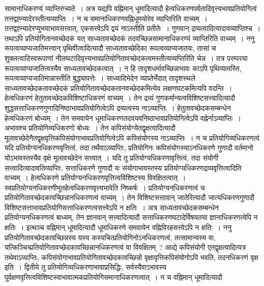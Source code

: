 सामानाधिकरण्यं व्याप्तिरुच्यते~।
अत्र यद्यपि वह्निमान् धूमादित्यादौ हेत्वधिकरणपर्वतादिवृत्त्यभावप्रतियोगित्वं तत्तद्वह्न्यादेरस्तीत्यव्याप्तिः~। न च समानाधिकरणवह्निधूमयोरेव व्याप्तिरिति
वाच्यम्~। तत्तद्वह्न्यादेरप्युभयाभावसत्त्वात्, एकसत्त्वेऽपि द्वयं नाऽस्तीति प्रतीतेः~। गुणवान् द्रव्यत्वादित्यादावव्याप्तिश्च~।
तथाऽपि प्रतियोगितानवच्छेदकं यत् साध्यतावच्छेदकं तदवच्छिन्नसामानाधिकरण्यं व्याप्तिरिति वाच्यम्~।
ननु रूपत्वव्याप्यजातिमत्त्वान् पृथिवीत्वादित्यादौ साध्यतावच्छेदिका रूपत्वव्याप्यजातयः, तासां च शुक्लत्वादिस्वरूपाणां
नीलघटादिवृत्त्यभावप्रतियोगितावच्छेदकत्वमस्तीत्यव्यप्तिरिति चेन्न~।
तत्र परम्परया रूपत्वव्याप्यजातित्वस्यैव साध्यतावच्छेदकत्वात्~। न हि तादृशधर्मावच्छिन्नाभावः काऽपि पृथिव्यामस्ति, रूपत्वव्याप्यजातिमान्नास्तीति बुद्ध्यापत्तेः~।
साध्यादिभेदेन व्याप्र्तेर्भेदात् तादृशस्थले साध्यतावच्छेदकतावच्छेदकं प्रतियोगितावच्छेदकतानवच्छेदकमित्येव लक्षणघटकमित्यपि वदन्ति~।
हेत्वधिकरणं हेतुतावच्छेदकविशिष्टाधिकरणं वाच्यम्~। तेन द्रव्यं गुणकर्मान्यत्वविशिष्टसत्त्वादित्यादौ शुद्धसत्ताधिकरणगुणादिनिष्ठाभावप्रतियोगित्वेऽपि द्रव्यत्वस्य
नाऽव्याप्तिः~।
हेतुतावच्छेदकसम्बन्धेन हेत्वधिकरणं बोध्यम्~। तेन समवायेन धूमाधिकरणतदवयवनिष्ठाभावप्रतियोगित्वेऽपि वह्नेर्नाऽव्याप्तिः~।
अभावश्च प्रतियोगिव्यधिकरणो बोध्यः~। तेन कपिसंयोग्येतद्वृक्षत्वादित्यादौ मूलावच्छेदेनैतद्वृक्षवृत्तिकपिसंयोगाभावप्रतियोगित्वेऽपि कपिसंयोगस्य नाऽव्याप्तिः~।
न च प्रतियोगिव्यधिकरणत्वं यदि प्रतियोग्यनधिकरणवृत्तित्वं, तदा तथैवाऽव्याप्तिः, प्रतियोगिनः कपिसंयोगस्याऽनधिकरणे गुणादौ वर्तमानो योऽभावस्तस्यैव
वृक्षे मूलावच्छेदेन सत्त्वात्~। यदि तु प्रतियोग्यधिकरणावृत्तित्वं, तदा संयोगी सत्त्वादित्यादावतिव्याप्तिः, सत्ताधिकरणे गुणादौ यः संयोगाभावस्तस्य प्रतियोग्यधिकरणद्रव्यवृत्तित्वादिति
वाच्यम्~। हेत्वधिकरणे प्रतियोग्यनधिकरणवृत्तित्वविशिष्टस्य विवक्षितत्वात्~। स्वप्रतियोग्यनधिकरणीभूतहेत्वधिकरणवृत्त्यभावेति निष्कर्षः~।
प्रतियोग्यनधिकरणत्वं च प्रतियोगितावच्छेदकावच्छिन्नानधिकरणत्वं वाच्यम्~। तेन विशिष्टसत्तावान् जातेरित्यादौ जात्यधिकरणगुणादौ
विशिष्टसत्ताभावप्रतियोगिसत्ताधिकरणत्वसत्त्वेऽपि न क्षतिः~।
अत्र साध्यतावच्छेदकसम्बन्धेन प्रतियोग्यनधिकरणत्वं बाध्यम्, तेन ज्ञानवान् सत्त्वादित्यादौ सत्ताधिकरणघटादेर्विषयतया ज्ञानाधिकरणत्वेपि न क्षतिः~।
इत्थञ्च वह्निमान् धूमादित्यादौ धूमाधिकरणे समवायेन वह्निविरहसत्त्वेऽपि न क्षतिः~।
ननु प्रतियोगितावच्छेदकावच्छिन्नस्य यस्य कस्यचित्प्रतियोगिनोऽनधिकरणत्वं, तत्सामान्यस्य वा, यत्किञ्चिच्प्रतियोगितावच्छेदकावच्छिन्नानधिकरणत्वं वा विवक्षितम्~?
आद्ये कपिसंयोगी एतद्वृक्षत्वादित्यत्र तथेवाऽव्याप्तिः, कपिसंयोगाभावप्रतियोगितावच्छेदकावच्छिन्नो वृक्षावृत्तिकपिसंयोगोऽपि भवति, तदनधिकरणं वृक्ष इति~।
द्वितीये तु प्रतियोगिव्यधिकरणाभावाप्रसिद्धिः, सर्वस्यैवाऽभावस्य पूर्वक्षणवृत्तित्वविशिष्टस्वाभावात्मकप्रतियोगिसमानाधिकरणत्वात्~। न च वह्निमान् धूमादित्यादौ
